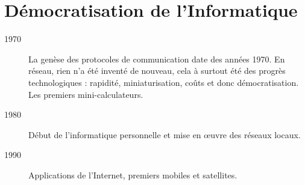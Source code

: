 		\section{Démocratisation de l'Informatique}
		\begin{description}
			\item[1970] La genèse des protocoles de communication date des années 1970. En réseau, rien n'a été inventé de nouveau, cela à surtout été des progrès technologiques : rapidité, miniaturisation, coûts et donc démocratisation. Les premiers mini-calculateurs.
			\item[1980] Début de l'informatique personnelle et mise en \oe{}uvre des réseaux locaux.
			\item[1990] Applications de l'Internet, premiers mobiles et satellites. 
		\end{description}

